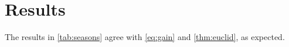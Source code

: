 \section{Results}\label{sec:results}

The results in \cref{tab:seasons} agree with \cref{eq:gain} and \cref{thm:euclid}, as
\citet{Duffie2013} expected.
